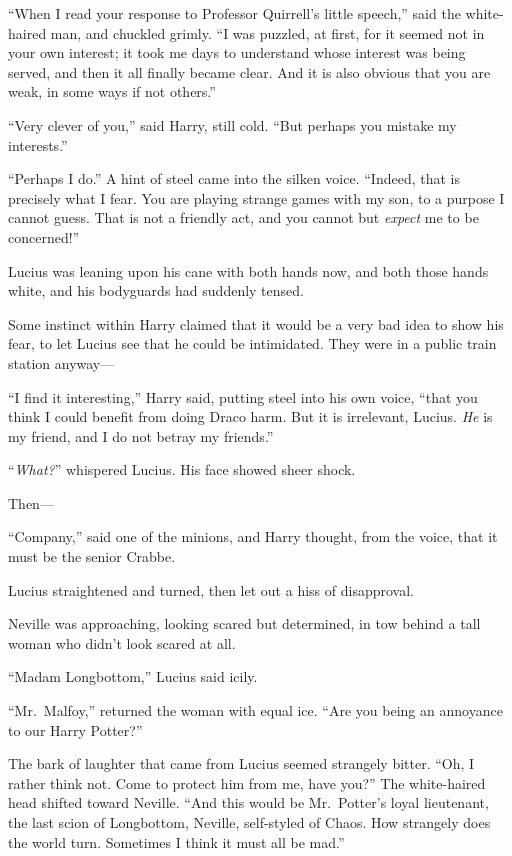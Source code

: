 “When I read your response to Professor Quirrell’s little speech,” said the white-haired man, and chuckled grimly. “I was puzzled, at first, for it seemed not in your own interest; it took me days to understand whose interest was being served, and then it all finally became clear. And it is also obvious that you are weak, in some ways if not others.”

“Very clever of you,” said Harry, still cold. “But perhaps you mistake my interests.”

“Perhaps I do.” A hint of steel came into the silken voice. “Indeed, that is precisely what I fear. You are playing strange games with my son, to a purpose I cannot guess. That is not a friendly act, and you cannot but \emph{expect} me to be concerned!”

Lucius was leaning upon his cane with both hands now, and both those hands white, and his bodyguards had suddenly tensed.

Some instinct within Harry claimed that it would be a very bad idea to show his fear, to let Lucius see that he could be intimidated. They were in a public train station anyway—

“I find it interesting,” Harry said, putting steel into his own voice, “that you think I could benefit from doing Draco harm. But it is irrelevant, Lucius. \emph{He} is my friend, and I do not betray my friends.”

“\emph{What?}” whispered Lucius. His face showed sheer shock.

Then—

“Company,” said one of the minions, and Harry thought, from the voice, that it must be the senior Crabbe.

Lucius straightened and turned, then let out a hiss of disapproval.

Neville was approaching, looking scared but determined, in tow behind a tall woman who didn’t look scared at all.

“Madam Longbottom,” Lucius said icily.

“Mr.~Malfoy,” returned the woman with equal ice. “Are you being an annoyance to our Harry Potter?”

The bark of laughter that came from Lucius seemed strangely bitter. “Oh, I rather think not. Come to protect him from me, have you?” The white-haired head shifted toward Neville. “And this would be Mr.~Potter’s loyal lieutenant, the last scion of Longbottom, Neville, self-styled of Chaos. How strangely does the world turn. Sometimes I think it must all be mad.”

